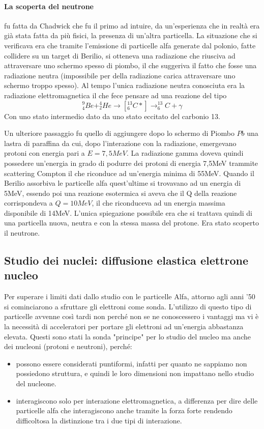 \paragraph{La scoperta del neutrone} fu fatta da Chadwick che fu il primo ad intuire, da un'esperienza che in realtà era già stata fatta da più fisici, la presenza di un'altra particella. 
La situazione che si verificava era che tramite l'emissione di particelle alfa generate dal polonio, fatte collidere su un target di Berilio, si otteneva una radiazione che riusciva ad attraversare uno schermo spesso di piombo, il che suggeriva il fatto che fosse una radiazione neutra (impossibile per della radiazione carica attraversare uno schermo troppo spesso). 
Al tempo l'unica radiazione neutra conosciuta era la radiazione elettromagnetica il che fece pensare ad una reazione del tipo
\[
^9_4Be+^4_2He\longrightarrow[^{13}_6C*]\longrightarrow^{13}_6C+\gamma
\]
Con uno stato intermedio dato da uno stato eccitato del carbonio 13.

Un ulteriore passaggio fu quello di aggiungere dopo lo schermo di Piombo $Pb$ una lastra di paraffina da cui, dopo l'interazione con la radiazione, emergevano protoni con energia pari a $E=7,5MeV$. 
La radiazione gamma doveva quindi possedere un'energia in grado di podurre dei protoni di energia 7,5MeV trammite scattering Compton il che riconduce ad un'energia minima di 55MeV.
Quando il Berilio assorbiva le particelle alfa quest'ultime si trovavano ad un energia di 5MeV, essendo poi una reazione esotermica si aveva che il Q della reazione corrispondeva a $Q=10MeV$, il che riconduceva ad un energia massima disponibile di 14MeV.
L'unica spiegazione possibile era che si trattava quindi di una particella nuova, neutra e con la stessa massa del protone.
Era stato scoperto il neutrone.

\subsection{Studio dei nuclei: diffusione elastica elettrone nucleo}
Per superare i limiti dati dallo studio con le particelle Alfa, attorno agli anni '50 si cominciarono a sfruttare gli elettroni come sonda.
L'utilizzo di questo tipo di particelle avvenne così tardi non perché non se ne conoscessero i vantaggi ma vi è la necessità di acceleratori per portare gli elettroni ad un'energia abbastanza elevata.
Questi sono stati la sonda "principe" per lo studio del nucleo ma anche dei nucleoni (protoni e neutroni), perché:
\begin{itemize}
\item possono essere considerati puntiformi, infatti per quanto ne sappiamo non possiedono struttura, e quindi le loro dimensioni non impattano nello studio del nucleone.
\item interagiscono solo per interazione elettromagnetica, a differenza per dire delle particelle alfa che interagiscono anche tramite la forza forte rendendo difficoltosa la distinzione tra i due tipi di interazione.
\end{itemize}

